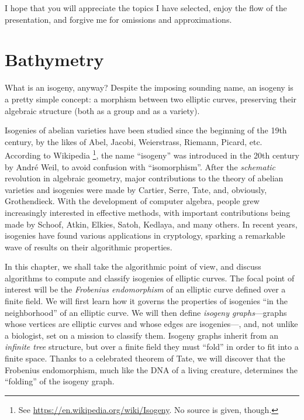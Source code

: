 \documentclass[b5layout]{hdr}
\begin{document}
I hope that you will appreciate the topics I have selected, enjoy the
flow of the presentation, and forgive me for omissions and
approximations.


\mainmatter

\chapter{Bathymetry}
\label{cha:tate}

What is an isogeny, anyway? %
Despite the imposing sounding name, an isogeny is a pretty simple
concept: a morphism between two elliptic curves, preserving their
algebraic structure (both as a group and as a variety). %

Isogenies of abelian varieties have been studied since the beginning
of the 19th century, by the likes of Abel, Jacobi, Weierstrass,
Riemann, Picard, etc. %
According to Wikipedia%
\footnote{See \url{https://en.wikipedia.org/wiki/Isogeny}. No source
  is given, though.}, %
the name ``isogeny'' was introduced in the 20th century by André Weil,
to avoid confusion with ``isomorphism''. %
After the \emph{schematic} revolution in algebraic geometry, major
contributions to the theory of abelian varieties and isogenies were
made by Cartier, Serre, Tate, and, obviously, Grothendieck. %
With the development of computer algebra, people grew increasingly
interested in effective methods, with important contributions being
made by Schoof, Atkin, Elkies, Satoh, Kedlaya, and many others. %
In recent years, isogenies have found various applications in
cryptology, sparking a remarkable wave of results on their algorithmic
properties. %

In this chapter, we shall take the algorithmic point of view, and
discuss algorithms to compute and classify isogenies of elliptic
curves. %
The focal point of interest will be the \emph{Frobenius endomorphism}
of an elliptic curve defined over a finite field. %
We will first learn how it governs the properties of isogenies ``in
the neighborhood'' of an elliptic curve. %
We will then define \emph{isogeny graphs}---graphs whose vertices are
elliptic curves and whose edges are isogenies---, and, not unlike a
biologist, set on a mission to classify them. %
Isogeny graphs inherit from an \emph{infinite tree} structure, but
over a finite field they must ``fold'' in order to fit into a finite
space. %
Thanks to a celebrated theorem of Tate, we will discover that the
Frobenius endomorphism, much like the DNA of a living creature,
determines the ``folding'' of the isogeny graph. %
\end{document}
